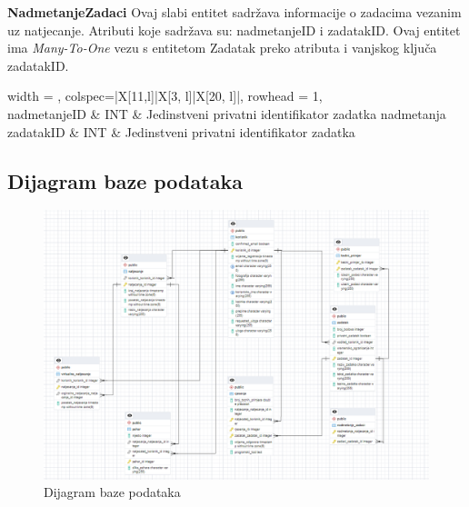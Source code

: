 \textbf{NadmetanjeZadaci} \quad Ovaj slabi entitet sadržava informacije o zadacima vezanim uz natjecanje. Atributi koje sadržava su: nadmetanjeID i zadatakID. Ovaj entitet ima \textit{Many-To-One} vezu s entitetom Zadatak preko atributa i vanjskog ključa zadatakID.
\begin{longtblr}[
					label=none,
					entry=none
				]{
					width = \textwidth,
					colspec={|X[11,l]|X[3, l]|X[20, l]|},
					rowhead = 1,
				} %
					\hline {}	 \\ \hline[3pt]
					nadmetanjeID & INT & Jedinstveni privatni identifikator zadatka nadmetanja  	\\ \hline
					zadatakID & INT &  Jedinstveni privatni identifikator zadatka \\ \hline
				\end{longtblr}


\pagebreak
\subsection{Dijagram baze podataka}
\begin{figure}[H]
	\includegraphics[scale=0.7]{dijagrami/dijagram_baze_podataka.png}
	\centering
	\caption{Dijagram baze podataka}
	\label{fig:bazaPodataka} 
\end{figure}

